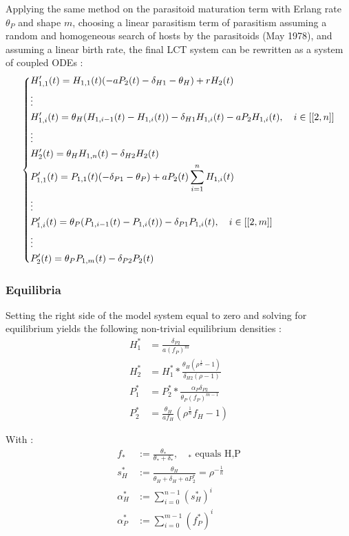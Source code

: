 \documentclass[12pt,a4paper,onecolumn]{article}
\begin{document}
Applying the same method on the parasitoid maturation term with Erlang rate $\theta_P$ and shape $m$, choosing a linear parasitism term of parasitism assuming a random and homogeneous search of hosts by the parasitoids (May 1978), and assuming a linear birth rate, the final LCT system can be rewritten as a system of coupled ODEs  :
\begin{equation}
\begin{dcases}
H_{1,1}'(t) = H_{1,1}(t)(-a P_2(t) - \delta_{H1} - \theta_H) + r H_2(t) \\
\vdots \\
H_{1,i}'(t) = \theta_H(H_{1,i-1}(t) - H_{1,i}(t)) - \delta_{H1} H_{1,i}(t) - aP_2H_{1,i}(t), \quad i \in [[2,n]] \\
\vdots \\
H_{2}'(t) = \theta_H H_{1,n}(t) - \delta_{H2} H_{2}(t) \\
P_{1,1}'(t) = P_{1,1}(t)(- \delta_{P1} - \theta_P) + a P_2(t) \sum_{i=1}^{n} H_{1,i}(t) \\
\vdots \\
P_{1,i}'(t) = \theta_P(P_{1,i-1}(t) - P_{1,i}(t)) - \delta_{P1} P_{1,i}(t), \quad i \in [[2,m]] \\
\vdots \\
P_{2}'(t) = \theta_P P_{1,m}(t) - \delta_{P2} P_{2}(t) \\
\end{dcases}
\end{equation}

\subsubsection{Equilibria}

Setting the right side of the model system equal to zero and solving for equilibrium yields the following non-trivial equilibrium densities :
\begin{align}
H_1^* &= \frac{\delta_{P2}}{a(f_P)^m} \nonumber \\
H_2^* &= H_1^* * \frac{\theta_{H} (\rho^{\frac{1}{n}}-1)}{\delta_{H2} (\rho-1)} \nonumber \\
P_1^* &= P_2^* * \frac{\alpha_P \delta_{P2}}{\theta_P (f_P)^{m-1}}  \\
P_2^*&= \frac{\theta_H}{a f_H} (\rho^{\frac{1}{n}}f_H -1) \nonumber
\end{align}

With :
\begin{align}
f_* &:= \frac{\theta_*}{\theta_* + \delta_*}, \quad \text{$_*$ equals H,P} \nonumber  \\
s_H^* &:= \frac{\theta_H}{\theta_H + \delta_H + aP_2^*} = \rho^{-\frac{1}{n}} \nonumber \\
\alpha_H^* &:= \sum_{i=0}^{n-1} (s_H^*)^i   \\
\alpha_P^* &:= \sum_{i=0}^{m-1} (f_P^*)^i \nonumber
\end{align}
\end{document}
